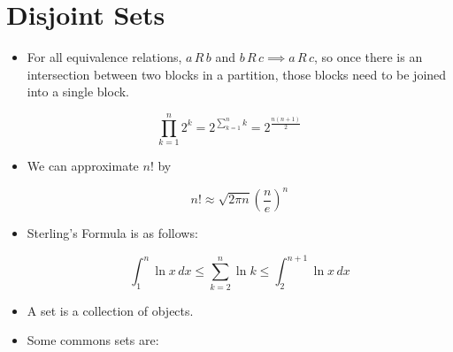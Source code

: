 \documentclass[12pt]{scrartcl}
\let\emptyset\varnothing{}
\begin{document}
\section{Disjoint Sets}
\begin{itemize}
    \item For all equivalence relations, $a\,R\,b$ and $b\,R\,c \implies a\,R\,c$, so once there is an intersection between two blocks in a partition, those blocks need to be joined into a single block.
\end{itemize}

\begin{equation*}
    \prod _{k = 1} ^n 2^k = 2^{\sum_{k = 1} ^n k} = 2^{\frac{n(n + 1)}{2}}
\end{equation*}

\begin{itemize}
    \item We can approximate $n$! by

        \begin{equation*}
            n! \approx \sqrt{2\pi n} {\left( \frac{n}{e} \right)}^n
        \end{equation*}

    \item Sterling's Formula is as follows:

        \begin{equation}
            \int _1 ^n \ln x\, dx \leq \sum_{k = 2} ^n \ln k \leq \int _2 ^{n + 1} \ln x\, dx
        \end{equation}

    \item A set is a collection of objects.
    \item Some commons sets are:


\end{itemize}
\end{document}
